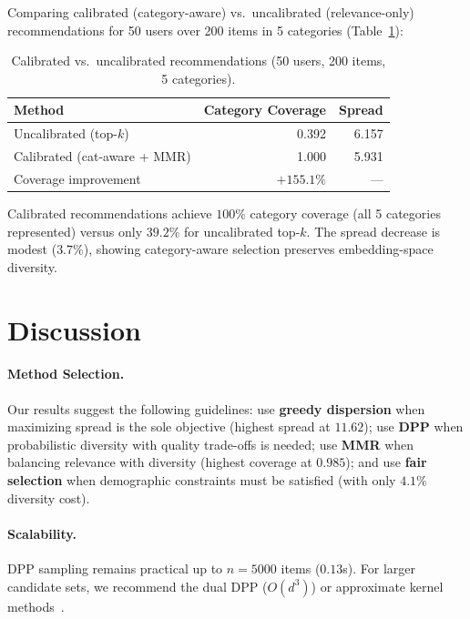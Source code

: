 \documentclass[11pt]{article}
\begin{document}
Comparing calibrated (category-aware) vs.\ uncalibrated (relevance-only)
recommendations for 50 users over 200 items in 5 categories
(Table~\ref{tab:recsys}):

\begin{table}[t]
\centering
\caption{Calibrated vs.\ uncalibrated recommendations (50 users, 200 items, 5 categories).}
\label{tab:recsys}
\begin{tabular}{lrr}
\toprule
\textbf{Method} & \textbf{Category Coverage} & \textbf{Spread} \\
\midrule
Uncalibrated (top-$k$) & 0.392 & 6.157 \\
Calibrated (cat-aware + MMR) & 1.000 & 5.931 \\
\midrule
Coverage improvement & $+155.1\%$ & --- \\
\bottomrule
\end{tabular}
\end{table}

Calibrated recommendations achieve $100\%$ category coverage (all 5
categories represented) versus only $39.2\%$ for uncalibrated top-$k$.
The spread decrease is modest ($3.7\%$), showing category-aware selection
preserves embedding-space diversity.

\section{Discussion}
\label{sec:discussion}

\paragraph{Method Selection.}
Our results suggest the following guidelines: use \textbf{greedy dispersion}
when maximizing spread is the sole objective (highest spread at $11.62$);
use \textbf{DPP} when probabilistic diversity with quality trade-offs is
needed; use \textbf{MMR} when balancing relevance with diversity
(highest coverage at $0.985$); and use \textbf{fair selection} when
demographic constraints must be satisfied (with only $4.1\%$ diversity cost).

\paragraph{Scalability.}
DPP sampling remains practical up to $n{=}5000$ items ($0.13$s). For
larger candidate sets, we recommend the dual DPP ($O(d^3)$) or approximate
kernel methods~\citep{rahimi2007random}.
\end{document}
